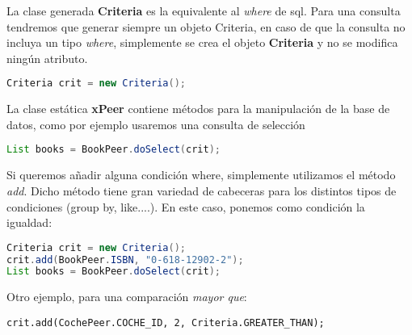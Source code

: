La clase generada {\bf Criteria} es la equivalente al {\em where} de sql. Para una consulta tendremos que generar siempre un objeto Criteria, en caso de que la consulta no incluya un tipo {\em where}, simplemente se crea el objeto {\bf Criteria} y no se modifica ningún atributo.

\begin{lstlisting}[language=Java]
Criteria crit = new Criteria();
\end{lstlisting}

La clase estática {\bf xPeer} contiene métodos para la manipulación de la base de datos, como por ejemplo usaremos una consulta de selección

\begin{lstlisting}[language=Java]
List books = BookPeer.doSelect(crit);
\end{lstlisting}

Si queremos añadir alguna condición where, simplemente utilizamos el método {\em add}. Dicho método tiene gran variedad de cabeceras para los distintos tipos de condiciones (group by, like....). En este caso, ponemos como condición la igualdad:

\begin{lstlisting}[language=Java]
Criteria crit = new Criteria();
crit.add(BookPeer.ISBN, "0-618-12902-2");
List books = BookPeer.doSelect(crit);
\end{lstlisting}

Otro ejemplo, para una comparación {\em mayor que}:

\begin{lstlisting}
crit.add(CochePeer.COCHE_ID, 2, Criteria.GREATER_THAN);
\end{lstlisting}